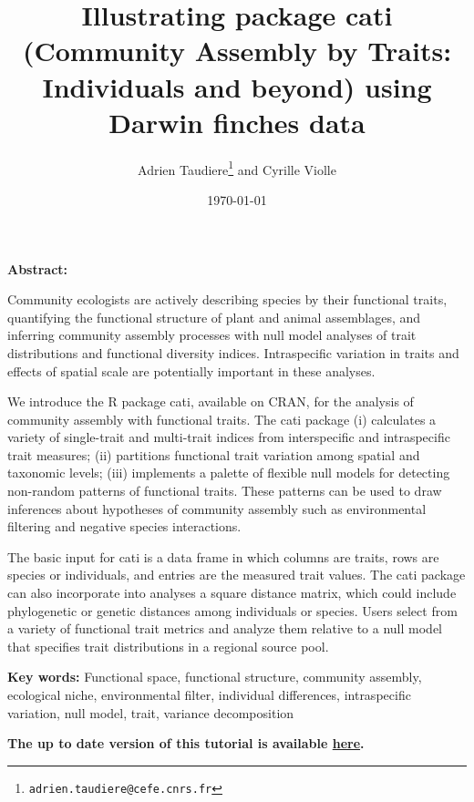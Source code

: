 \documentclass[12pt]{article}\usepackage[]{graphicx}\usepackage[]{color}
\title{Illustrating package cati (Community Assembly by Traits: Individuals and beyond) using Darwin finches data}
\author{Adrien Taudiere\thanks{\texttt{adrien.taudiere@cefe.cnrs.fr}} and Cyrille Violle}
\affil{{\footnotesize CEFE - Centre d'Ecologie Fonctionnelle et Evolutive, Montpellier: France}}
\date{\today}
\begin{document}



\maketitle


\textbf{Abstract:}

Community ecologists are actively describing species by their functional traits, quantifying the functional structure of plant and animal assemblages, and inferring community assembly processes with null model analyses of trait distributions and functional diversity indices. Intraspecific variation in traits and effects of spatial scale are potentially important in these analyses.

  We introduce the R package cati, available on CRAN, for the analysis of community assembly with functional traits. The cati package (i) calculates a variety of single-trait and multi-trait indices from interspecific and intraspecific trait measures; (ii) partitions functional trait variation among spatial and taxonomic levels; (iii) implements a palette of flexible null models for detecting non-random patterns of functional traits. These patterns can be used to draw inferences about hypotheses of community assembly such as environmental filtering and negative species interactions.

The basic input for cati is a data frame in which columns are traits, rows are species or individuals, and entries are the measured trait values. The cati package can also incorporate into analyses a square distance matrix, which could include phylogenetic or genetic distances among individuals or species. Users select from a variety of functional trait metrics and analyze them relative to a null model that specifies trait distributions in a regional source pool.

\textbf{Key words:}
Functional space, functional structure, community assembly, ecological niche, environmental filter, individual differences, intraspecific variation, null model, trait, variance decomposition

\vfill
\begin{center}
\textbf{The up to date version of this tutorial is available \href{https://github.com/adrientaudiere/cati/blob/Package-cati/Documentation/vignette_Darwin_finches/vignette.pdf}{here}.}
\end{center}

\newpage
\tableofcontents
\end{document}

